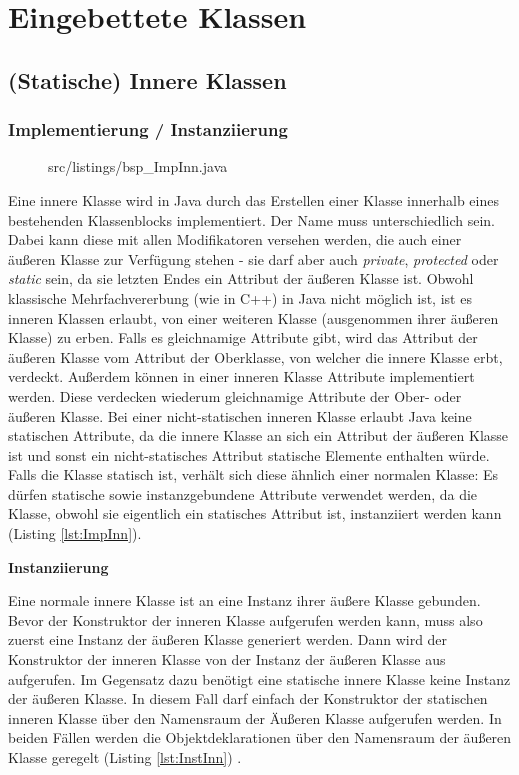 \chapter{Eingebettete Klassen}
\section{(Statische) Innere Klassen}
\subsection {Implementierung / Instanziierung}

\begin{figure}[H]
\lstset{language=Java}
 {src/listings/bsp_ImpInn.java}
\end{figure}

Eine innere Klasse wird in Java durch das Erstellen einer Klasse innerhalb eines bestehenden Klassenblocks implementiert.
Der Name muss unterschiedlich sein. Dabei kann diese mit allen Modifikatoren versehen werden, die auch einer äußeren Klasse zur Verfügung stehen - sie darf aber auch {\it private}, {\it protected} oder {\it static} sein, da sie letzten Endes ein Attribut der äußeren Klasse ist.
Obwohl klassische Mehrfachvererbung (wie in C++) in Java nicht möglich ist, ist es inneren Klassen erlaubt, von einer weiteren Klasse (ausgenommen ihrer äußeren Klasse) zu erben.
Falls es gleichnamige Attribute gibt, wird das Attribut der äußeren Klasse vom Attribut der Oberklasse, von welcher die innere Klasse erbt, verdeckt.
Außerdem können in einer inneren Klasse Attribute implementiert werden. Diese verdecken wiederum gleichnamige Attribute der Ober- oder äußeren Klasse.
Bei einer nicht-statischen inneren Klasse erlaubt Java keine statischen Attribute, da die innere Klasse an sich ein Attribut der äußeren Klasse ist und sonst ein nicht-statisches Attribut statische Elemente enthalten würde.
Falls die Klasse statisch ist, verhält sich diese ähnlich einer normalen Klasse: Es dürfen statische sowie instanzgebundene Attribute verwendet werden, da die Klasse, obwohl sie eigentlich ein statisches Attribut ist, instanziiert werden kann (Listing \ref{lst:ImpInn}).


{\bf Instanziierung}

Eine normale innere Klasse ist an eine Instanz ihrer äußere Klasse gebunden. Bevor der Konstruktor der inneren Klasse aufgerufen werden kann, muss also zuerst eine Instanz der äußeren Klasse generiert werden.
Dann wird der Konstruktor der inneren Klasse von der Instanz der äußeren Klasse aus aufgerufen.
Im Gegensatz dazu benötigt eine statische innere Klasse keine Instanz der äußeren Klasse.
In diesem Fall darf einfach der Konstruktor der statischen inneren Klasse über den Namensraum der Äußeren Klasse aufgerufen werden.
In beiden Fällen werden die Objektdeklarationen über den Namensraum der äußeren Klasse geregelt (Listing \ref{lst:InstInn}) \cite{goll2013java}.

